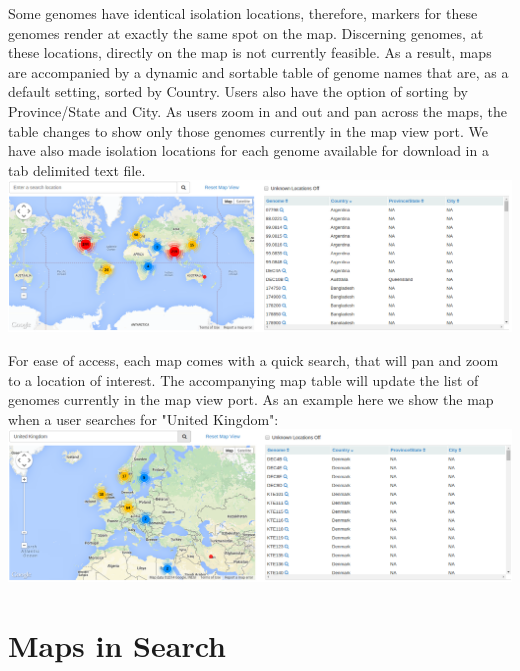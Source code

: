 \documentclass[12pt]{article}
\begin{document}
\begin{landscape}

Some genomes have identical isolation locations, therefore, markers for these genomes render at exactly the same spot on the map. Discerning genomes, at these locations, directly on the map is not currently feasible. As a result, maps are accompanied by a dynamic and sortable table of genome names that are, as a default setting, sorted by Country. Users also have the option of sorting by Province/State and City. As users zoom in and out and pan across the maps, the table changes to show only those genomes currently in the map view port. We have also made isolation locations for each genome available for download in a tab delimited text file.\\

\includegraphics[scale=0.36]{../manuscript_images/map.png}

\end{landscape}

\pagebreak

\begin{landscape}

For ease of access, each map comes with a quick search, that will pan and zoom to a location of interest. The accompanying map table will update the list of genomes currently in the map view port. As an example here we show the map when a user searches for "United Kingdom":\\

\includegraphics[scale=0.36]{../manuscript_images/uk-map.png}

\end{landscape}

\section{Maps in Search}
\end{document}
